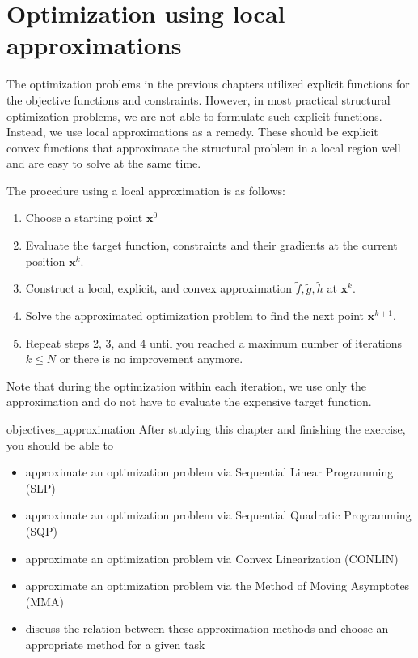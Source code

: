 \chapter{Optimization using local approximations}
The optimization problems in the previous chapters utilized explicit functions for the objective functions and constraints. However, in most practical structural optimization problems, we are not able to formulate such explicit functions. Instead, we use local approximations as a remedy. These should be explicit convex functions that approximate the structural problem in a local region well and are easy to solve at the same time. 

The procedure using a local approximation is as follows:

\begin{enumerate}
    \item Choose a starting point $\mathbf{x}^0$
    \item Evaluate the target function, constraints and their gradients at the current position $\mathbf{x}^k$.
    \item Construct a local, explicit, and convex approximation $\tilde{f}, \tilde{g}, \tilde{h}$ at $\mathbf{x}^k$.
    \item Solve the approximated optimization problem to find the next point $\mathbf{x}^{k+1}$. 
    \item Repeat steps 2, 3, and 4 until you reached a maximum number of iterations $k \le N$ or there is no improvement anymore.
\end{enumerate}

Note that during the optimization within each iteration, we use only the approximation and do not have to evaluate the expensive target function.

\begin{objectives}{}{objectives_approximation}
After studying this chapter and finishing the exercise, you should be able to 
\begin{itemize}[label=$\dots$]
    \item approximate an optimization problem via Sequential Linear Programming (SLP)
    \item approximate an optimization problem via Sequential Quadratic Programming (SQP)
    \item approximate an optimization problem via Convex Linearization (CONLIN)
    \item approximate an optimization problem via the Method of Moving Asymptotes (MMA)
    \item discuss the relation between these approximation methods and choose an appropriate method for a given task
\end{itemize}
\end{objectives}

